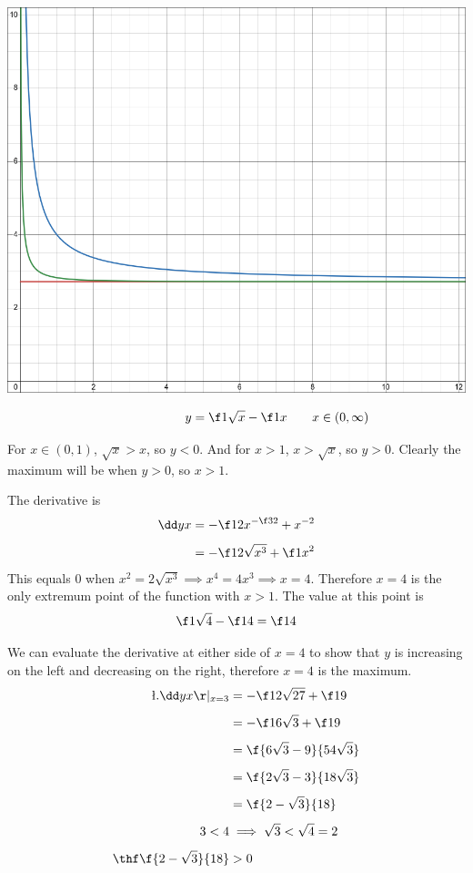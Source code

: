 \documentclass[a4paper]{article}
\begin{document}
\begin{center}
	\includegraphics[scale=0.3]{Q1-graph.png}
\end{center}



$$\phantom{\qquad x \in (0, \infty)} y = \f1{\sqrt x} - \f1x \qquad x \in (0, \infty)$$

For $x \in (0,1)$, $\sqrt x > x$, so $y < 0$. And for $x > 1$, $x > \sqrt x$, so $y > 0$. Clearly the maximum will be when $y > 0$, so $x > 1$.

The derivative is \begin{align*}
\dd yx &= -\f12 x^{-\f32} + x^{-2}\\[1ex]
&= - \f1{2\sqrt{x^3}} + \f1{x^2}
\end{align*}
This equals 0 when $x^2 = 2 \sqrt{x^3} \implies x^4 = 4x^3 \implies x = 4$. Therefore $x = 4$ is the only extremum point of the function with $x > 1$. The value at this point is $$\f1{\sqrt 4} - \f14 = \f14$$

We can evaluate the derivative at either side of $x=4$ to show that $y$ is increasing on the left and decreasing on the right, therefore $x=4$ is the maximum.
\begin{align*}
\l. \dd yx \r|_{x=3} &= -\f1{2 \sqrt{27}} + \f19\\[1ex]
&= -\f1{6 \sqrt3} + \f19\\[1ex]
&= \f{6 \sqrt3 - 9}{54 \sqrt3}\\[1ex]
&= \f{2 \sqrt3 - 3}{18 \sqrt3}\\[1ex]
&= \f{2 - \sqrt 3}{18}\\[1ex]
3 < 4 &\implies \sqrt 3 < \sqrt 4 = 2\\[1ex]
\thf \f{2 - \sqrt 3}{18} &> 0
\end{align*}
\end{document}
